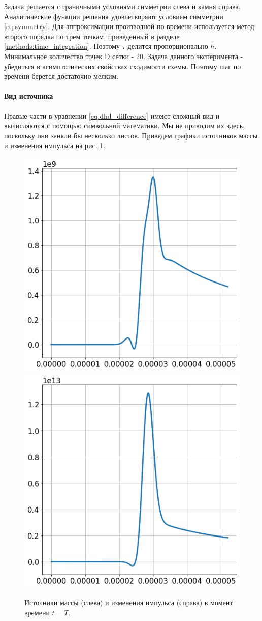 Задача решается с граничными условиями симметрии слева и камня справа. Аналитические функции решения удовлетворяют условиям симметрии \eqref{eq:symmetry}. Для аппроксимации производной по времени используется метод второго порядка по трем точкам, приведенный в разделе \ref{methods:time_integration}. Поэтому $\tau$ делится пропорционально $h$. Минимальное количество точек D сетки - 20. Задача данного эксперимента - убедиться в асимптотических свойствах сходимости схемы. Поэтому шаг по времени берется достаточно мелким.
\paragraph{Вид источника}
Правые части в уравнении \eqref{eq:dhd_difference} имеют сложный вид и вычисляются с помощью символьной математики. Мы не приводим их здесь, поскольку они заняли бы несколько листов. Приведем графики источников массы и изменения импульса на рис. \ref{fig:dhd_convergence_source}.
\begin{figure}[H]
\centering
\includegraphics[width=.4\textwidth]{dhd_convergence/source_n.png}
\includegraphics[width=.4\textwidth]{dhd_convergence/source_v.png}
\caption{Источники массы (слева) и изменения импульса (справа) в момент времени $t=T$.}
\label{fig:dhd_convergence_source}
\end{figure}
